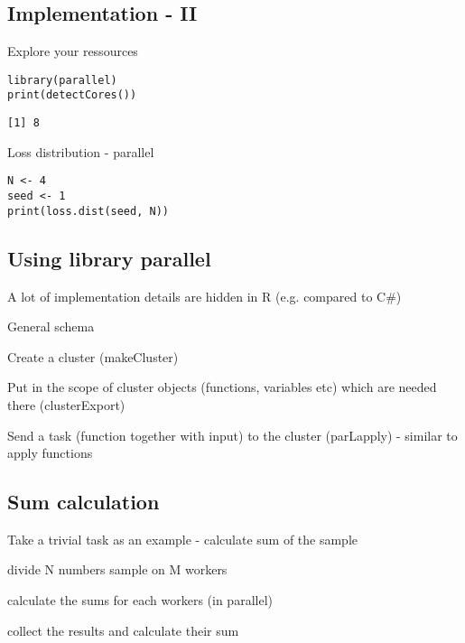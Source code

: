 \documentclass[bigger]{beamer}
\begin{document}
\subsection{Implementation - II}
\label{sec-3-2}
\begin{frame}[fragile,label=sec-3-2-1]{Explore your ressources}
 \begin{verbatim}
library(parallel)
print(detectCores())
\end{verbatim}

\begin{verbatim}
[1] 8
\end{verbatim}
\end{frame}

\begin{frame}[fragile,label=sec-3-2-2]{Loss distribution - parallel}
 \begin{verbatim}
N <- 4
seed <- 1
print(loss.dist(seed, N))
\end{verbatim}
\end{frame}

\subsection{Using library parallel}
\label{sec-3-3}
\begin{frame}[label=sec-3-3-1]{A lot of implementation details are hidden in R (e.g. compared to C\#)}
\end{frame}
\begin{frame}[label=sec-3-3-2]{General schema}
\begin{block}{Create a cluster (\alert{makeCluster})}
\end{block}
\begin{block}{Put in the scope of cluster objects (functions, variables etc) which are needed there (\alert{clusterExport})}
\end{block}
\begin{block}{Send a task (function together with input) to the cluster (\alert{parLapply}) - similar to apply functions}
\end{block}
\end{frame}
\subsection{Sum calculation}
\label{sec-3-4}
\begin{frame}[label=sec-3-4-1]{Take a trivial task as an example - calculate sum of the sample}
\end{frame}
\begin{frame}[label=sec-3-4-2]{divide N numbers sample on M workers}
\end{frame}
\begin{frame}[label=sec-3-4-3]{calculate the sums for each workers (in parallel)}
\end{frame}
\begin{frame}[label=sec-3-4-4]{collect the results and calculate their sum}
\end{frame}
\end{document}
